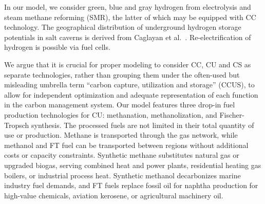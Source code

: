 \documentclass[twocolumn]{article}
\begin{document}

In our model, we consider green, blue and gray hydrogen from electrolysis and steam methane reforming (SMR), the latter of which may be equipped with CC technology. The geographical distribution of underground hydrogen storage potentials in salt caverns is derived from Caglayan et al.~\cite{caglayanTechnicalPotentialSalt2020}. Re-electrification of hydrogen is possible via fuel cells.


We argue that it is crucial for proper modeling to consider CC, CU and CS as separate technologies, rather than grouping them under the often-used but misleading umbrella term ``carbon capture, utilization and storage'' (CCUS), to allow for independent optimization and adequate representation of each function in the carbon management system.
Our model features three drop-in fuel production technologies for CU: methanation, methanolization, and Fischer-Tropsch synthesis.
The processed fuels are not limited in their total quantity of use or production.
Methane is transported through the gas network, while methanol and FT fuel can be transported between regions without additional costs or capacity constraints.
Synthetic methane substitutes natural gas or upgraded biogas, serving combined heat and power plants, residential heating gas boilers, or industrial process heat.
Synthetic methanol decarbonizes marine industry fuel demands, and FT fuels replace fossil oil for naphtha production for high-value chemicals, aviation kerosene, or agricultural machinery oil.
\end{document}
